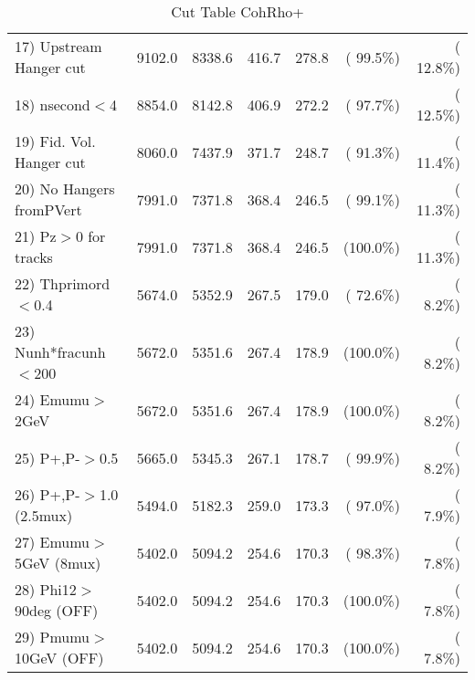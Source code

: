 \begin{table}[h!]
\begin{tabular}{||l||r|r|r|r|r|r||}
 17) Upstream Hanger cut  &       9102.0 &       8338.6 &        416.7 &        278.8 & ( 99.5\%) & ( 12.8\%) \\
 18) nsecond$<$4          &       8854.0 &       8142.8 &        406.9 &        272.2 & ( 97.7\%) & ( 12.5\%) \\
 19) Fid. Vol. Hanger cut &       8060.0 &       7437.9 &        371.7 &        248.7 & ( 91.3\%) & ( 11.4\%) \\
 20) No Hangers fromPVert &       7991.0 &       7371.8 &        368.4 &        246.5 & ( 99.1\%) & ( 11.3\%) \\
 21) Pz$>$0 for tracks    &       7991.0 &       7371.8 &        368.4 &        246.5 & (100.0\%) & ( 11.3\%) \\
 22) Thprimord$<$0.4      &       5674.0 &       5352.9 &        267.5 &        179.0 & ( 72.6\%) & (  8.2\%) \\
 23) Nunh*fracunh$<$200   &       5672.0 &       5351.6 &        267.4 &        178.9 & (100.0\%) & (  8.2\%) \\
 24) Emumu$>$2GeV         &       5672.0 &       5351.6 &        267.4 &        178.9 & (100.0\%) & (  8.2\%) \\
 25) P+,P-$>$0.5          &       5665.0 &       5345.3 &        267.1 &        178.7 & ( 99.9\%) & (  8.2\%) \\
 26) P+,P-$>$1.0 (2.5mux) &       5494.0 &       5182.3 &        259.0 &        173.3 & ( 97.0\%) & (  7.9\%) \\
 27) Emumu$>$5GeV  (8mux) &       5402.0 &       5094.2 &        254.6 &        170.3 & ( 98.3\%) & (  7.8\%) \\
 28) Phi12$>$90deg  (OFF) &       5402.0 &       5094.2 &        254.6 &        170.3 & (100.0\%) & (  7.8\%) \\
 29) Pmumu$>$10GeV  (OFF) &       5402.0 &       5094.2 &        254.6 &        170.3 & (100.0\%) & (  7.8\%) \\
 \hline
 \hline
 \end{tabular}
 \caption{Cut Table  CohRho+  }
 \label{tab-cutcohjpsi-mumu_cohrhop}
 \end{table}

